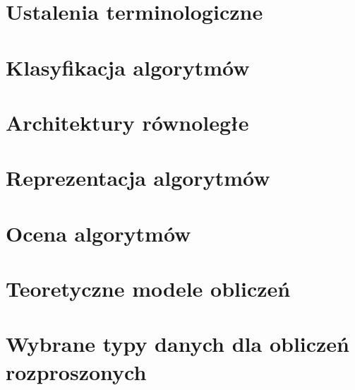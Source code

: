 \section{Ustalenia terminologiczne}\label{sub:terms}


\newpage

\section{Klasyfikacja algorytmów}\label{sub:algorithms}


\section{Architektury równoległe}\label{sub:architectures}


\section{Reprezentacja algorytmów}\label{sub:representation}


\section{Ocena algorytmów}\label{sub:performance_measures}


\newpage

\section{Teoretyczne modele obliczeń}\label{sub:computation_models}


\section{Wybrane typy danych dla obliczeń rozproszonych}\label{sub:datatypes}



